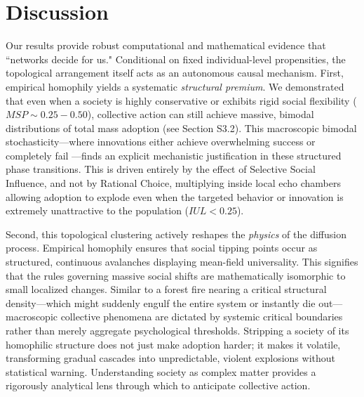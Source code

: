 \documentclass[5p,twocolumn,authoryear]{elsarticle}
\begin{document}
\section{Discussion}

Our results provide robust computational and mathematical evidence that ``networks decide for us." Conditional on fixed individual-level propensities, the topological arrangement itself acts as an autonomous causal mechanism. First, empirical homophily yields a systematic \textit{structural premium}. We demonstrated that even when a society is highly conservative or exhibits rigid social flexibility ($MSP \sim 0.25 - 0.50$), collective action can still achieve massive, bimodal distributions of total mass adoption (see Section S3.2). This macroscopic bimodal stochasticity---where innovations either achieve overwhelming success or completely fail \citep{arthur1993, farrell1998}---finds an explicit mechanistic justification in these structured phase transitions. This is driven entirely by the effect of Selective Social Influence, and not by Rational Choice, multiplying inside local echo chambers allowing adoption to explode even when the targeted behavior or innovation is extremely unattractive to the population ($IUL < 0.25$).

Second, this topological clustering actively reshapes the \textit{physics} of the diffusion process. Empirical homophily ensures that social tipping points occur as structured, continuous avalanches displaying mean-field universality. This signifies that the rules governing massive social shifts are mathematically isomorphic to small localized changes. Similar to a forest fire nearing a critical structural density---which might suddenly engulf the entire system or instantly die out---macroscopic collective phenomena are dictated by systemic critical boundaries rather than merely aggregate psychological thresholds. Stripping a society of its homophilic structure does not just make adoption harder; it makes it volatile, transforming gradual cascades into unpredictable, violent explosions without statistical warning. Understanding society as complex matter provides a rigorously analytical lens through which to anticipate collective action.
\end{document}
